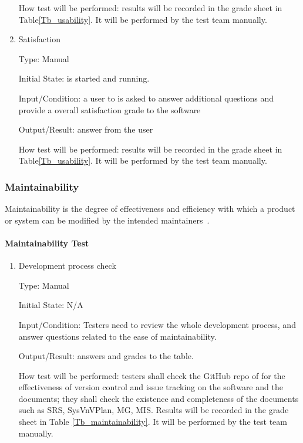 \documentclass[12pt, titlepage]{article}
\begin{document}
\begin{enumerate}
How test will be performed: results will be recorded in the grade sheet in
Table\ref{Tb_usability}. It will be performed by the test team manually.
					
\item{Satisfaction}

Type: Manual
					
Initial State: \progname{} is started and running.
					
Input/Condition: a user to \progname{} is asked to answer additional questions
and provide a overall satisfaction grade to the software
					
Output/Result: answer from the user
					
How test will be performed: results will be recorded in the grade sheet in
Table\ref{Tb_usability}. It will be performed by the test team manually.

\end{enumerate}

\subsubsection{Maintainability}
\label{sec_Maintaintest} Maintainability is the degree of effectiveness and
efficiency with which a product or system can be modified by the intended
maintainers~\cite{ISO/IEC25010:2011}.

\paragraph{Maintainability Test}

\begin{enumerate}

\item{Development process check}

Type: Manual
					
Initial State: N/A
					
Input/Condition: Testers need to review the whole development process, and
answer questions related to the ease of maintainability.
					
Output/Result: answers and grades to the table.
					
How test will be performed: testers shall check the GitHub repo of \progname{}
for the effectiveness of version control and issue tracking on the software and
the documents; they shall check the existence and completeness of the documents
such as SRS, SysVnVPlan, MG, MIS. Results will be recorded in the grade sheet
in Table \ref{Tb_maintainability}. It will be performed by the test team manually.
\end{enumerate}
\end{document}
